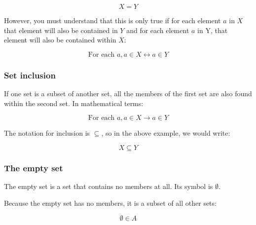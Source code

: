 \begin{dmath*}
	X = Y
\end{dmath*}

However, you must understand that this is only true if for each element $a$ in
$X$ that element will also be contained in $Y$ and for each element $a$ in Y,
that element will also be contained within $X$:

\begin{dmath*}
	{\textrm{For each }a, a \in X \leftrightarrow a \in Y}
\end{dmath*}


\subsubsection{Set inclusion}

If one set is a subset of another set, all the members of the first set are also
found within the second set. In mathematical terms:

\begin{dmath*}
	{\textrm{For each }a, a \in X \rightarrow a \in Y}
\end{dmath*}

The notation for inclusion is $\subseteq$, so in the above example, we would
write:

\begin{dmath*}
	X \subseteq Y
\end{dmath*}


\subsubsection{The empty set}
\label{subsubsec:empty_set}

The empty set is a set that contains no members at all. Its symbol is
$\emptyset$.

Because the empty set has no members, it is a subset of all other sets:

\begin{dmath*}
	\emptyset \in A
\end{dmath*}

